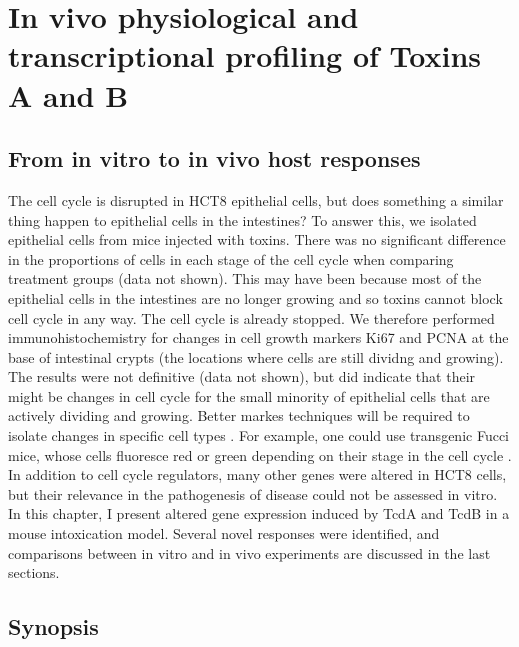 
\chapter[In vivo toxin responses]{ In vivo physiological and transcriptional profiling of Toxins A and B }

\section{From in vitro to in vivo host responses}
The cell cycle is disrupted in HCT8 epithelial cells, but does something a similar
thing happen to epithelial cells in the intestines? To answer this,
we isolated epithelial cells from mice injected with toxins.
There was no significant difference in the proportions of cells in each stage of the
cell cycle when comparing treatment groups (data not shown). This may have been
because most of the epithelial cells in the intestines are no longer growing
and so toxins cannot block cell cycle in any way. The cell cycle is already stopped.
We therefore performed immunohistochemistry for changes in cell growth markers
Ki67 and PCNA at the base of intestinal crypts (the locations where cells are still
dividng and growing). The results were not definitive (data not shown), but did
indicate that their might be changes in cell cycle for the small minority of
epithelial cells that are actively dividing and growing. Better markes techniques
will be required to isolate changes in specific cell 
types \cite{Blanpain:2013tq,Barker:2012ul}. For example,
one could use transgenic Fucci mice, whose cells fluoresce red or green depending
on their stage in the cell cycle \cite{SakaueSawano:2008ul}.
In addition to cell cycle regulators, many other genes were altered
in HCT8 cells, but their relevance in the pathogenesis of disease
could not be assessed in vitro. In this chapter, I present altered gene expression
induced by TcdA and TcdB in a mouse intoxication model. Several novel
responses were identified, and comparisons between in vitro and in vivo
experiments are discussed in the last sections.


\section{Synopsis}

